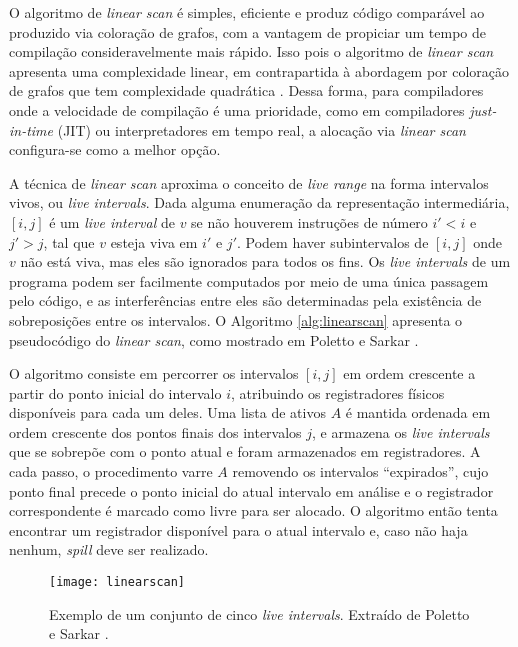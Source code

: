 \documentclass[
	12pt,				%
	openright,			%
	oneside,			%
	a4paper,			%
	tccpreliminar,			%
	]{ABNT-DC-UEL}
\begin{document}
O algoritmo de \textit{linear scan} é simples, eficiente e produz código comparável ao produzido via coloração de grafos, com a vantagem de propiciar um tempo de compilação consideravelmente mais rápido. Isso pois o algoritmo de \textit{linear scan} apresenta uma complexidade linear, em contrapartida à abordagem por coloração de grafos que tem complexidade quadrática \cite{johansson:01}. Dessa forma, para compiladores onde a velocidade de compilação é uma prioridade, como em compiladores \textit{just-in-time} (JIT) ou interpretadores em tempo real, a alocação via \textit{linear scan} configura-se como a melhor opção.

A técnica de \textit{linear scan} aproxima o conceito de \textit{live range} na forma intervalos vivos, ou \textit{live intervals}. Dada alguma enumeração da representação intermediária, $[i,j]$ é um \textit{live interval} de $v$ se não houverem instruções de número $i'<i$ e $j'>j$, tal que $v$ esteja viva em $i'$ e $j'$. Podem haver subintervalos de $[i,j]$ onde $v$ não está viva, mas eles são ignorados para todos os fins. Os \textit{live intervals} de um programa podem ser facilmente computados por meio de uma única passagem pelo código, e as interferências entre eles são determinadas pela existência de sobreposições entre os intervalos. O Algoritmo \ref{alg:linearscan} apresenta o pseudocódigo do \textit{linear scan}, como mostrado em Poletto e Sarkar \cite{poletto:99}.

O algoritmo consiste em percorrer os intervalos $[i,j]$ em ordem crescente a partir do ponto inicial do intervalo $i$, atribuindo os registradores físicos disponíveis para cada um deles. Uma lista de ativos $A$ é mantida ordenada em ordem crescente dos pontos finais dos intervalos $j$, e armazena os \textit{live intervals} que se sobrepõe com o ponto atual e foram armazenados em registradores. A cada passo, o procedimento varre $A$ removendo os intervalos ``expirados'', cujo ponto final precede o ponto inicial do atual intervalo em análise e o registrador correspondente é marcado como livre para ser alocado. O algoritmo então tenta encontrar um registrador disponível para o atual intervalo e, caso não haja nenhum, \textit{spill} deve ser realizado.

\begin{figure}[ht]
    \centering
    \texttt{[image: linearscan]}
    \caption{Exemplo de um conjunto de cinco \textit{live intervals}. Extraído de Poletto e Sarkar \cite{poletto:99}.}
    \label{fig:linearscan}
\end{figure}
\end{document}
